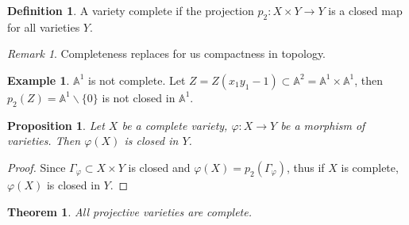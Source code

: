 \documentclass{amsart}
\theoremstyle{plain}
\newtheorem{theorem}{Theorem}
\newtheorem{proposition}{Proposition}
\theoremstyle{definition}
\newtheorem{definition}{Definition}
\newtheorem{example}{Example}
\theoremstyle{remark}
\newtheorem*{remark}{Remark}
\numberwithin{equation}{section}
\begin{document}
\begin{definition}
	A variety complete if the projection $ p_2:X\times Y\to Y $ is a closed map for all varieties $ Y $.
\end{definition}
\begin{remark}
	Completeness replaces for us compactness in topology.
\end{remark}
\begin{example}
	$ \mathbb{A}^1 $ is not complete. Let $ Z=Z(x_1y_1-1)\subset \mathbb{A}^2=\mathbb{A}^1\times \mathbb{A}^1 $, then $ p_2(Z)=\mathbb{A}^1\backslash\{ 0 \} $ is not closed in $ \mathbb{A}^1 $.
\end{example}
\begin{proposition}
	Let $ X $ be a complete variety, $ \varphi:X\to Y $ be a morphism of varieties. Then $ \varphi(X) $ is closed in $ Y $.
\end{proposition}
\begin{proof}
	Since $ \Gamma_\varphi\subset X\times Y $ is closed and $ \varphi(X)=p_2(\Gamma_\varphi) $, thus if $ X $ is complete, $ \varphi(X) $ is closed in $ Y $.
\end{proof}
\begin{theorem}
	All projective varieties are complete.
\end{theorem}
\end{document}
